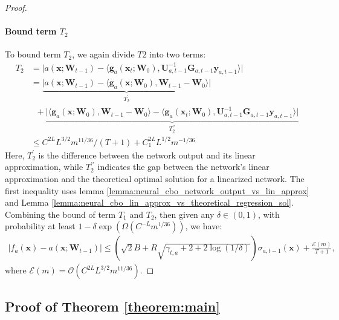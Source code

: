 \begin{proof}
\paragraph{Bound term $T_2$}
To bound term $T_2$, we again divide $T2$ into two terms:
\begin{align*}
    T_2 &=\lvert a(\mathbf{x}; \mathbf{W}_{t-1}) - \langle \mathbf{g}_a(\mathbf{x}_{t};\mathbf{W}_{0}),\mathbf{U}_{a,t-1}^{-1}\mathbf{G}_{a,t-1}\mathbf{y}_{a,t-1} \rangle  \rvert 
    \\
    &= \underbrace{\lvert a(\mathbf{x}; \mathbf{W}_{t-1}) - \langle \mathbf{g}_a(\mathbf{x};\mathbf{W}_0), \mathbf{W}_{t-1} - \mathbf{W}_0 \rangle \rvert}_{T_2^\prime} \\
    & \;\; + \underbrace{\lvert \langle \mathbf{g}_a(\mathbf{x};\mathbf{W}_0), \mathbf{W}_{t-1} - \mathbf{W}_0 \rangle  - \langle \mathbf{g}_a(\mathbf{x}_{t};\mathbf{W}_{0}),\mathbf{U}_{a,t-1}^{-1}\mathbf{G}_{a,t-1}\mathbf{y}_{a,t-1} \rangle   \rvert}_{T_2^{\prime \prime}}
    \\
    & \le C^{2L} L^{3/2} m^{11/36}/ (T+1) + C_1^{2L} L^{1/2} m^{-1/36} 
\end{align*}
Here, $T_2^{\prime}$ is the difference between the network output and its linear approximation, while $T_2^{\prime \prime}$ indicates the gap between the network's linear approximation and the theoretical optimal solution for a linearized network. The first inequality uses lemma \ref{lemma:neural_cbo_network_output_vs_lin_approx} and Lemma \ref{lemma:neural_cbo_lin_approx_vs_theoretical_regression_sol}. Combining the bound of term $T_1$ and $T_2$, then given any $\delta \in (0,1)$,  with probability at least $1 - \delta \exp (\Omega(C^{-L} m^{1/36}))$, we have:
\begin{align*}
     \lvert f_a(\mathbf{x}) - a(\mathbf{x}; \mathbf{W}_{t-1}) \rvert \le  \left(\sqrt{2}B + R \sqrt{\gamma_{t,a} + 2 + 2 \log(1/\delta)}\right)\sigma_{a, t-1}(\mathbf{x}) + \frac{\mathcal{E}(m)}{T+1}, 
\end{align*}
where $\mathcal{E}(m) = \mathcal{O}(C^{2L} L^{3/2} m^{11/36})$.
\end{proof}

\subsection{Proof of Theorem \ref{theorem:main}}

\TheoremMain*


